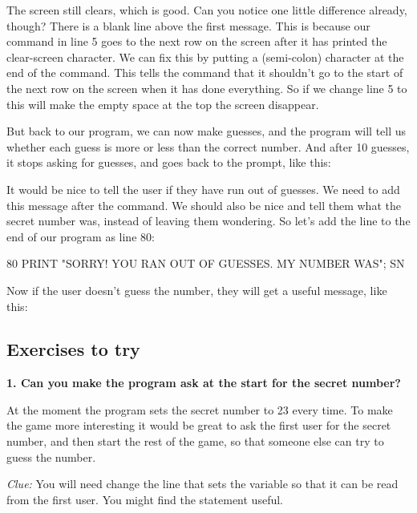 
The screen still clears, which is good.  Can you notice one little
difference already, though?  There is a blank line above the first
message. This is because our  command in line 5 goes to
the next row on the screen after it has printed the clear-screen character.  We can
fix this by putting a \stw{;} (semi-colon) character at the end of the
 command.  This tells the  command that it
shouldn't go to the start of the next row on the screen when it has
done everything.  So if we change line 5 to  this
will make the empty space at the top the screen disappear.

\needspace{4cm}
But back to our program, we can now make guesses, and the program
will tell us whether each guess is more or less than the correct
number.  And after 10 guesses, it stops asking for guesses, and goes
back to the  prompt, like this:


\needspace{2cm}
It would be nice to tell the user if they have run out of
guesses. We need to add this message after the  command.
We should also be nice and tell them what the secret number was,
instead of leaving them wondering.
So let's add the line to the end of our program as line 80:

\begin{screenoutput}
80 PRINT "SORRY! YOU RAN OUT OF GUESSES. MY NUMBER WAS"; SN
\end{screenoutput}

\needspace{4cm}
Now if the user doesn't guess the number, they will get a useful
message, like this:


\subsection{Exercises to try}

{\bf 1. Can you make the program ask at the start for the secret number?}

At the moment the program sets the secret number to 23 every
time. To make the game more interesting it would be great to ask the
first user for the secret number, and then start the rest of the game,
so that someone else can try to guess the number.

{\em Clue:} You will need change the line that sets the  variable
so that it can be read from the first user. You might find the
 statement useful.

